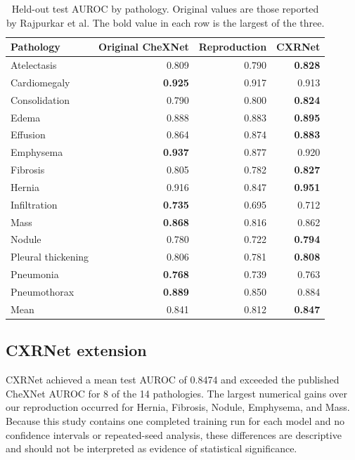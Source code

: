 \begin{table}[ht]
\centering
\small
\begin{tabular}{lrrr}
\hline
\textbf{Pathology} & \textbf{Original CheXNet} & \textbf{Reproduction} & \textbf{CXRNet} \\
\hline
Atelectasis        & 0.809 & 0.790 & \textbf{0.828} \\
Cardiomegaly       & \textbf{0.925} & 0.917 & 0.913 \\
Consolidation      & 0.790 & 0.800 & \textbf{0.824} \\
Edema              & 0.888 & 0.883 & \textbf{0.895} \\
Effusion           & 0.864 & 0.874 & \textbf{0.883} \\
Emphysema          & \textbf{0.937} & 0.877 & 0.920 \\
Fibrosis           & 0.805 & 0.782 & \textbf{0.827} \\
Hernia             & 0.916 & 0.847 & \textbf{0.951} \\
Infiltration       & \textbf{0.735} & 0.695 & 0.712 \\
Mass               & \textbf{0.868} & 0.816 & 0.862 \\
Nodule             & 0.780 & 0.722 & \textbf{0.794} \\
Pleural thickening & 0.806 & 0.781 & \textbf{0.808} \\
Pneumonia          & \textbf{0.768} & 0.739 & 0.763 \\
Pneumothorax       & \textbf{0.889} & 0.850 & 0.884 \\
\hline
Mean               & 0.841 & 0.812 & \textbf{0.847} \\
\hline
\end{tabular}
\caption{Held-out test AUROC by pathology. Original values are those reported
by Rajpurkar et al. The bold value in each row is the largest of the three.}
\label{tab:test_auc_scores}
\end{table}

\subsection{CXRNet extension}

CXRNet achieved a mean test AUROC of 0.8474 and exceeded the published CheXNet
AUROC for 8 of the 14 pathologies. The largest numerical gains over our
reproduction occurred for Hernia, Fibrosis, Nodule, Emphysema, and Mass.
Because this study contains one completed training run for each model and no
confidence intervals or repeated-seed analysis, these differences are
descriptive and should not be interpreted as evidence of statistical
significance.

